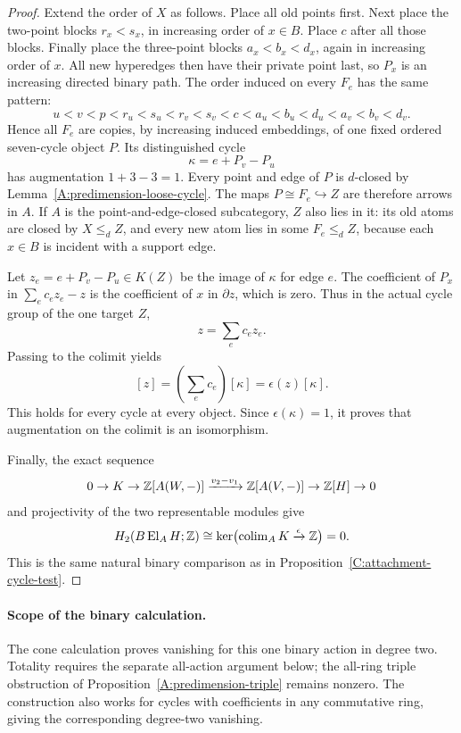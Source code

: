 \begin{proof}
Extend the order of $X$ as follows. Place all old points first.
Next place the two-point blocks $r_x<s_x$, in increasing order of
$x\in B$. Place $c$ after all those blocks. Finally place the
three-point blocks $a_x<b_x<d_x$, again in increasing order of
$x$. All new hyperedges then have their private point last, so
$P_x$ is an increasing directed binary path. The order induced on
every $F_e$ has the same pattern:
\[
 u<v<p<r_u<s_u<r_v<s_v<c
       <a_u<b_u<d_u<a_v<b_v<d_v.
\]
Hence all $F_e$ are copies, by increasing induced embeddings, of
one fixed ordered seven-cycle object $P$. Its distinguished cycle
\[
 \kappa=e+P_v-P_u
\]
has augmentation $1+3-3=1$. Every point and edge of $P$ is
$d$-closed by Lemma~\ref{A:predimension-loose-cycle}. The maps
$P\cong F_e\hookrightarrow Z$ are therefore arrows in $A$.
If $A$ is the point-and-edge-closed subcategory, $Z$ also lies in
it: its old atoms are closed by $X\leq_d Z$, and every new atom
lies in some $F_e\leq_d Z$, because each $x\in B$ is incident
with a support edge.

Let $z_e=e+P_v-P_u\in K(Z)$ be the image of $\kappa$ for edge $e$.
The coefficient of $P_x$ in $\sum_e c_e z_e-z$ is the coefficient
of $x$ in $\partial z$, which is zero. Thus in the actual cycle
group of the one target $Z$,
\[
 z=\sum_e c_e z_e.
\]
Passing to the colimit yields
\[
 [z]=\left(\sum_e c_e\right)[\kappa]=\epsilon(z)[\kappa].
\]
This holds for every cycle at every object. Since $\epsilon(\kappa)=1$,
it proves that augmentation on the colimit is an isomorphism.

Finally, the exact sequence
\[
 0\to K\to\mathbb Z[A(W,-)]\xrightarrow{v_2-v_1}
 \mathbb Z[A(V,-)]\to\mathbb Z[H]\to0
\]
and projectivity of the two representable modules give
\[
 H_2(B\operatorname{El}_A H;\mathbb Z)
 \cong\ker\bigl(\operatorname{colim}_A K
                         \xrightarrow{\epsilon}\mathbb Z\bigr)=0.
\]
This is the same natural binary comparison as in
Proposition~\ref{C:attachment-cycle-test}.
\end{proof}

\paragraph{Scope of the binary calculation.}
The cone calculation proves vanishing for this one binary action in
degree two. Totality requires the separate all-action argument below;
the all-ring triple obstruction of
Proposition~\ref{A:predimension-triple} remains nonzero.
The construction also works for cycles with coefficients in any
commutative ring, giving the corresponding degree-two vanishing.
